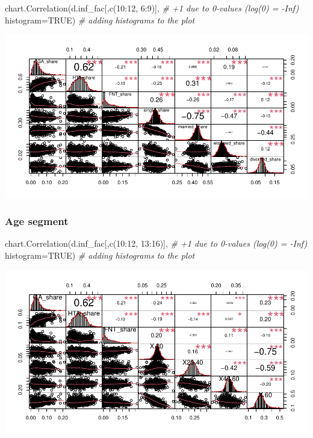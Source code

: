 \documentclass[
]{article}
\newenvironment{Shaded}{\begin{snugshade}}{\end{snugshade}}
\newcommand{\AttributeTok}[1]{\textcolor[rgb]{0.77,0.63,0.00}{#1}}
\newcommand{\CommentTok}[1]{\textcolor[rgb]{0.56,0.35,0.01}{\textit{#1}}}
\newcommand{\ConstantTok}[1]{\textcolor[rgb]{0.00,0.00,0.00}{#1}}
\newcommand{\DecValTok}[1]{\textcolor[rgb]{0.00,0.00,0.81}{#1}}
\newcommand{\FunctionTok}[1]{\textcolor[rgb]{0.00,0.00,0.00}{#1}}
\newcommand{\NormalTok}[1]{#1}
\newcommand{\SpecialCharTok}[1]{\textcolor[rgb]{0.00,0.00,0.00}{#1}}
\begin{document}
\begin{Shaded}
\begin{Highlighting}[]
\FunctionTok{chart.Correlation}\NormalTok{(d.inf\_fac[,}\FunctionTok{c}\NormalTok{(}\DecValTok{10}\SpecialCharTok{:}\DecValTok{12}\NormalTok{, }\DecValTok{6}\SpecialCharTok{:}\DecValTok{9}\NormalTok{)], }\CommentTok{\# +1 due to 0{-}values (log(0) = {-}Inf)}
                  \AttributeTok{histogram=}\ConstantTok{TRUE}\NormalTok{) }\CommentTok{\# adding histograms to the plot}
\end{Highlighting}
\end{Shaded}

\includegraphics{Lin_Mod_Clus_Analysis_files/figure-latex/unnamed-chunk-6-1.pdf}

\hypertarget{age-segment}{%
\subsubsection{Age segment}\label{age-segment}}

\begin{Shaded}
\begin{Highlighting}[]
\FunctionTok{chart.Correlation}\NormalTok{(d.inf\_fac[,}\FunctionTok{c}\NormalTok{(}\DecValTok{10}\SpecialCharTok{:}\DecValTok{12}\NormalTok{, }\DecValTok{13}\SpecialCharTok{:}\DecValTok{16}\NormalTok{)], }\CommentTok{\# +1 due to 0{-}values (log(0) = {-}Inf)}
                  \AttributeTok{histogram=}\ConstantTok{TRUE}\NormalTok{) }\CommentTok{\# adding histograms to the plot}
\end{Highlighting}
\end{Shaded}

\includegraphics{Lin_Mod_Clus_Analysis_files/figure-latex/unnamed-chunk-7-1.pdf}
\end{document}

